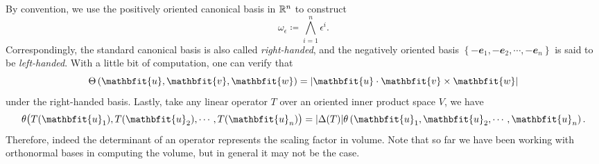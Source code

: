 \documentclass[math]{amznotes}
\theoremstyle{remark}
\begin{document}
By convention, we use the positively oriented canonical basis in $\mathbb{R}^n$ to construct 
\begin{equation*}
    \omega_{\epsilon} \coloneqq \bigwedge_{i = 1}^n\epsilon^i.
\end{equation*}
Correspondingly, the standard canonical basis is also called \textit{right-handed}, and the negatively oriented basis $\left\{-\mathbfit{e}_1, -\mathbfit{e}_2, \cdots, -\mathbfit{e}_n\right\}$ is said to be \textit{left-handed}. With a little bit of computation, one can verify that 
\begin{equation*}
    \Theta\left(\mathbfit{u}, \mathbfit{v}, \mathbfit{w}\right) = \abs{\mathbfit{u} \cdot \mathbfit{v} \times \mathbfit{w}}
\end{equation*}
under the right-handed basis. Lastly, take any linear operator $T$ over an oriented inner product space $V$, we have 
\begin{align*}
    \theta\bigl(T(\mathbfit{u}_1), T(\mathbfit{u}_2), \cdots, T(\mathbfit{u}_n)\bigr) = \abs{\Delta(T)}\theta\left(\mathbfit{u}_1, \mathbfit{u}_2, \cdots, \mathbfit{u}_n\right).
\end{align*}
Therefore, indeed the determinant of an operator represents the scaling factor in volume. Note that so far we have been working with orthonormal bases in computing the volume, but in general it may not be the case.
\end{document}
